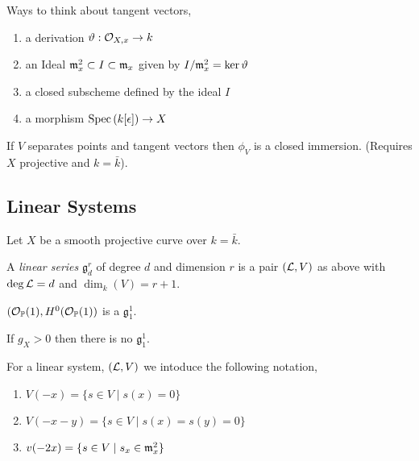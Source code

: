 \documentclass[12pt]{article}
\begin{document}
\begin{rmk}
Ways to think about tangent vectors,
\begin{enumerate}
\item a derivation $\vartheta : \mathcal{O}_{X, x} \to k$
\item an Ideal $\mathfrak{m}_x^2 \subset I \subset \mathfrak{m}_x$ given by $I/\mathfrak{m}_x^2 = \ker{\vartheta}$
\item a closed subscheme defined by the ideal $I$
\item a morphism $\mathrm{Spec}\left( k[\epsilon] \right) \to X$
\end{enumerate}
\end{rmk}

\begin{lemma}
If $V$ separates points and tangent vectors then $\phi_V$ is a closed immersion. (Requires $X$ projective and $k = \bar{k}$).
\end{lemma}

\subsection{Linear Systems}

Let $X$ be a smooth projective curve over $k = \bar{k}$.

\newcommand{\g}{\mathfrak{g}}

\begin{defn}
A \textit{linear series} $\g^r_d$ of degree $d$ and dimension $r$ is a pair $(\mathcal{L}, V)$ as above with $\deg{\mathcal{L}} = d$ and $\dim_k(V) = r + 1$. 
\end{defn}

\begin{example}
$(\mathcal{O}_{\mathbb{P}}(1), H^0(\mathcal{O}_{\mathbb{P}}(1))$ is a $\g^1_1$. 
\end{example}

\begin{prop}
If $g_X > 0$ then there is no $\g^1_1$. 
\end{prop}

\begin{rmk}
For a linear system, $(\mathcal{L}, V)$ we intoduce the following notation,
\begin{enumerate}
\item $V(-x) = \{ s \in V \mid s(x) = 0 \}$
\item $V(-x - y) = \{ s \in V \mid s(x) = s(y) = 0 \}$
\item $v(-2x) = \{ s \in V \mid s_x \in \mathfrak{m}_x^2 \}$
\end{enumerate}
\end{rmk}
\end{document}
